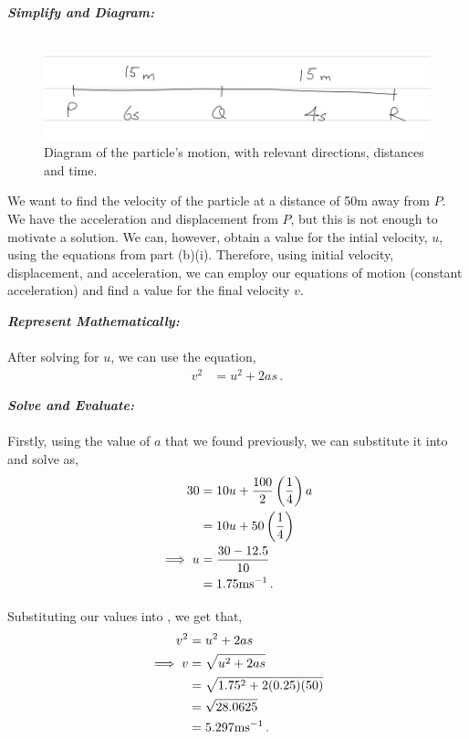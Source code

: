 \begin{subquestions}
\begin{subsubquestions}
\subsubquestion
\textbf{\textit{Simplify and Diagram:}} \\ \\
\begin{figure}[H]
	\begin{center}
		\includegraphics[scale=0.5]{../2010/figures/2010q5-2}
		\caption{\label{2010:q5:Move6} Diagram of the particle's motion, with relevant directions, distances and time.}
	\end{center}
\end{figure}
We want to find the velocity of the particle at a distance of 50m away from $P$. We have the acceleration and displacement from $P$, but this is not enough to motivate a solution. We can, however, obtain a value for the intial velocity, $u$, using the equations from part (b)(i). Therefore, using initial velocity, displacement, and acceleration, we can employ our equations of motion (constant acceleration) and find a value for the final velocity $v$.




\textbf{\textit{Represent Mathematically:}} \\ \\
After solving for $u$, we can use the equation,
\begin{align}
	v^2 & = u^2 + 2as \label{2010:q5:MoveEqn5} \,. 
\end{align}




\textbf{\textit{Solve and Evaluate:}} \\ \\
Firstly, using the value of $a$ that we found previously, we can substitute it into  and solve as,
\begin{align}
	30 & = 10u + \frac{100}{2}\left(\frac{1}{4}\right)a \nonumber \\
	   & = 10u + 50\left(\frac{1}{4}\right) \nonumber \\
	   \implies u & = \frac{30-12.5}{10} \nonumber \\
	   & = 1.75 \text{ms}^{-1} \,.
\end{align}

Substituting our values into , we get that,
\begin{align}
	v^2 & = u^2 + 2as \nonumber \\
	\implies v & = \sqrt{u^2+2as} \nonumber \\
	  & = \sqrt{1.75^2+2(0.25)(50)} \nonumber \\
	  & = \sqrt{28.0625} \nonumber \\
	  & =  5.297 \text{ms}^{-1} \,.
\end{align}

\end{subsubquestions}
	
\end{subquestions}